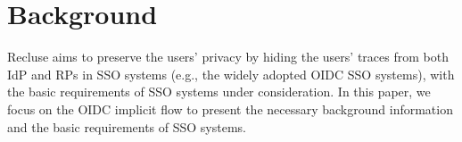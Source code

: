 \section{Background}
\label{sec:background}
Recluse aims to preserve the users' privacy by hiding the users' traces from both IdP and RPs in SSO systems (e.g., the widely adopted OIDC SSO systems), with the basic requirements of SSO systems under consideration. In this paper, we focus on the OIDC implicit flow to present the necessary background information  and the basic requirements of SSO systems.



